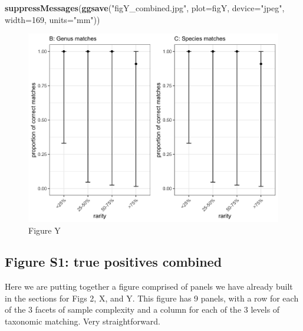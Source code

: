 \documentclass[
]{article}
\newenvironment{Shaded}{\begin{snugshade}}{\end{snugshade}}
\newcommand{\DataTypeTok}[1]{\textcolor[rgb]{0.13,0.29,0.53}{#1}}
\newcommand{\DecValTok}[1]{\textcolor[rgb]{0.00,0.00,0.81}{#1}}
\newcommand{\KeywordTok}[1]{\textcolor[rgb]{0.13,0.29,0.53}{\textbf{#1}}}
\newcommand{\NormalTok}[1]{#1}
\newcommand{\StringTok}[1]{\textcolor[rgb]{0.31,0.60,0.02}{#1}}
\begin{document}
\begin{Shaded}
\begin{Highlighting}[]
\KeywordTok{suppressMessages}\NormalTok{(}\KeywordTok{ggsave}\NormalTok{(}\StringTok{"figY_combined.jpg"}\NormalTok{, }\DataTypeTok{plot=}\NormalTok{figY, }\DataTypeTok{device=}\StringTok{"jpeg"}\NormalTok{, }\DataTypeTok{width=}\DecValTok{169}\NormalTok{, }\DataTypeTok{units=}\StringTok{"mm"}\NormalTok{))}
\end{Highlighting}
\end{Shaded}

\begin{figure}
\centering
\includegraphics{figY_combined.jpg}
\caption{Figure Y}
\end{figure}

\hypertarget{figure-s1-true-positives-combined}{%
\subsection{Figure S1: true positives
combined}\label{figure-s1-true-positives-combined}}

Here we are putting together a figure comprised of panels we have
already built in the sections for Figs 2, X, and Y. This figure has 9
panels, with a row for each of the 3 facets of sample complexity and a
column for each of the 3 levels of taxonomic matching. Very
straightforward.
\end{document}

